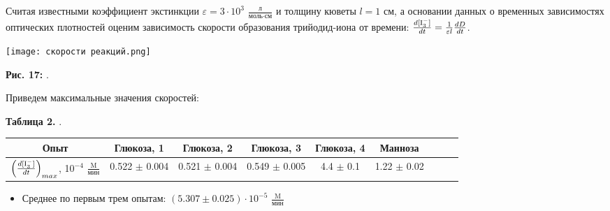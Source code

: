 \documentclass[a4paper]{article}
\begin{document}
Считая известными коэффициент экстинкции $\varepsilon = 3 \cdot 10^3$ $\frac{\text{л}}{\text{моль} \cdot \text{см}}$ и толщину кюветы $l = 1$ см, а основании данных о временных зависимостях оптических плотностей оценим зависимость скорости образования трийодид-иона от времени: $\frac{d[\rm I_3^{-}]}{dt} = \frac{1}{\varepsilon l} \frac{dD}{dt}$.

\graphicspath{{./images/}}
		\begin{center}
		
			\texttt{[image: скорости реакций.png]}
    \par
\textbf{Рис. 17: }.
 \end{center}
\par \vspace{0.5 cm}

Приведем максимальные значения скоростей:
\par \vspace{0.2 cm}

\begin{center}
\textbf{Таблица 2.} . \normalfont

\vspace{0.3cm}
\begin{tabular}{|c|c|c|c|c|c|c|c|c|}
    \hline
    Опыт & Глюкоза, 1 & Глюкоза, 2 & Глюкоза, 3 & Глюкоза, 4 & Манноза\\
    \hline
    $\left( \frac{d[\rm I_3^{-}]}{dt} \right)_{max}$, 10$^{-4}$ $\frac{\text{M}}{\text{мин}}$ & 0.522 $\pm$ 0.004 & 0.521 $\pm$ 0.004 & 0.549 $\pm$ 0.005 & 4.4 $\pm$ 0.1 & 1.22 $\pm$ 0.02 \\
    \hline

\end{tabular}
\end{center}

\par \vspace{0.2 cm}
\begin{itemize}
    \item Среднее по первым трем опытам: $(5.307 \pm 0.025) \cdot 10^{-5}$ $\frac{\text{M}}{\text{мин}}$
\end{itemize}
\par \vspace{0.2 cm}
\end{document}
